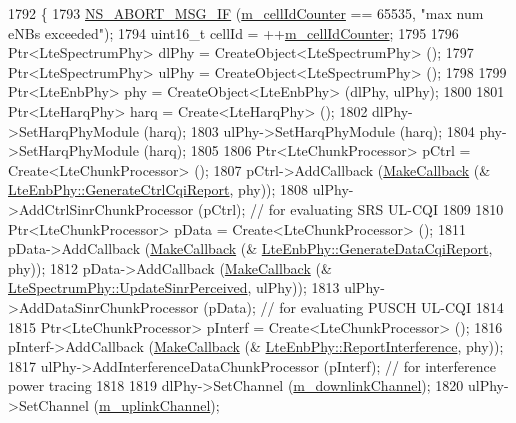 \begin{DoxyCode}
1792 \{
1793         \hyperlink{group__fatal_ga6653324225bc139e46deea177614ceee}{NS\_ABORT\_MSG\_IF} (\hyperlink{classns3_1_1MmWaveHelper_a8386109fad3e913312ba2833c0116ea8}{m\_cellIdCounter} == 65535, \textcolor{stringliteral}{"max num eNBs exceeded"});
1794         uint16\_t cellId = ++\hyperlink{classns3_1_1MmWaveHelper_a8386109fad3e913312ba2833c0116ea8}{m\_cellIdCounter};
1795 
1796         Ptr<LteSpectrumPhy> dlPhy = CreateObject<LteSpectrumPhy> ();
1797         Ptr<LteSpectrumPhy> ulPhy = CreateObject<LteSpectrumPhy> ();
1798 
1799         Ptr<LteEnbPhy> phy = CreateObject<LteEnbPhy> (dlPhy, ulPhy);
1800 
1801         Ptr<LteHarqPhy> harq = Create<LteHarqPhy> ();
1802         dlPhy->SetHarqPhyModule (harq);
1803         ulPhy->SetHarqPhyModule (harq);
1804         phy->SetHarqPhyModule (harq);
1805 
1806         Ptr<LteChunkProcessor> pCtrl = Create<LteChunkProcessor> ();
1807         pCtrl->AddCallback (\hyperlink{group__makecallbackmemptr_ga9376283685aa99d204048d6a4b7610a4}{MakeCallback} (&
      \hyperlink{classns3_1_1LteEnbPhy_abf6978d738fa1f07c4ca36dd1b6fd5b1}{LteEnbPhy::GenerateCtrlCqiReport}, phy));
1808         ulPhy->AddCtrlSinrChunkProcessor (pCtrl); \textcolor{comment}{// for evaluating SRS UL-CQI}
1809 
1810         Ptr<LteChunkProcessor> pData = Create<LteChunkProcessor> ();
1811         pData->AddCallback (\hyperlink{group__makecallbackmemptr_ga9376283685aa99d204048d6a4b7610a4}{MakeCallback} (&
      \hyperlink{classns3_1_1LteEnbPhy_a606a5f28fc9d71d470d305b967698596}{LteEnbPhy::GenerateDataCqiReport}, phy));
1812         pData->AddCallback (\hyperlink{group__makecallbackmemptr_ga9376283685aa99d204048d6a4b7610a4}{MakeCallback} (&
      \hyperlink{classns3_1_1LteSpectrumPhy_a81e55daa6bf70765f7e7ff7cca0faed9}{LteSpectrumPhy::UpdateSinrPerceived}, ulPhy));
1813         ulPhy->AddDataSinrChunkProcessor (pData); \textcolor{comment}{// for evaluating PUSCH UL-CQI}
1814 
1815         Ptr<LteChunkProcessor> pInterf = Create<LteChunkProcessor> ();
1816         pInterf->AddCallback (\hyperlink{group__makecallbackmemptr_ga9376283685aa99d204048d6a4b7610a4}{MakeCallback} (&
      \hyperlink{classns3_1_1LteEnbPhy_a41cfff736fd62873a41e569c7dcc2287}{LteEnbPhy::ReportInterference}, phy));
1817         ulPhy->AddInterferenceDataChunkProcessor (pInterf); \textcolor{comment}{// for interference power tracing}
1818 
1819         dlPhy->SetChannel (\hyperlink{classns3_1_1MmWaveHelper_aa8d0ffe634d74e461d22d96afcec0239}{m\_downlinkChannel});
1820         ulPhy->SetChannel (\hyperlink{classns3_1_1MmWaveHelper_a4f2b3aa855c0324fadfd5b174e240a66}{m\_uplinkChannel});

\end{DoxyCode}
